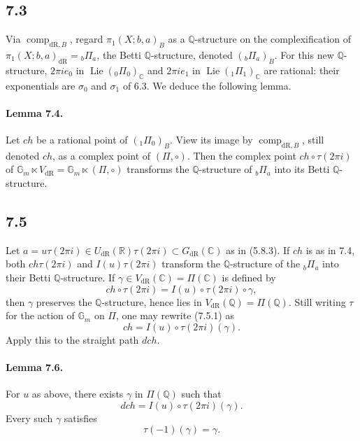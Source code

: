 \documentclass[10pt]{article}
\newcommand{\Q}{\mathbb Q}
\newcommand{\R}{\mathbb R}
\newcommand{\C}{\mathbb C}
\newcommand{\Gm}{\mathbb G_m}
\newcommand{\Lie}{\operatorname{Lie}}
\newcommand{\comp}{\operatorname{comp}}
\newcommand{\dR}{\mathrm{dR}}
\begin{document}
\subsection*{7.3}
Via $\comp_{\dR,B}$, regard $\pi_1(X;b,a)_B$ as a $\Q$-structure on the complexification of $\pi_1(X;b,a)_{\dR}={}_b\Pi_a$, the Betti $\Q$-structure, denoted $({}_b\Pi_a)_B$. For this new $\Q$-structure, $2\pi i e_0$ in $\Lie({}_0\Pi_0)_\C$ and $2\pi i e_1$ in $\Lie({}_1\Pi_1)_\C$ are rational: their exponentials are $\sigma_0$ and $\sigma_1$ of 6.3. We deduce the following lemma.

\paragraph{Lemma 7.4.}
Let $ch$ be a rational point of $({}_1\Pi_0)_B$. View its image by $\comp_{\dR,B}$, still denoted $ch$, as a complex point of $(\Pi,\circ)$. Then the complex point $ch\circ\tau(2\pi i)$ of $\Gm\ltimes V_{\dR}=\Gm\ltimes(\Pi,\circ)$ transforms the $\Q$-structure of ${}_b\Pi_a$ into its Betti $\Q$-structure.

\subsection*{7.5}
Let $a=u\tau(2\pi i)\in U_{\dR}(\R)\tau(2\pi i)\subset G_{\dR}(\C)$ as in (5.8.3). If $ch$ is as in 7.4, both $ch\tau(2\pi i)$ and $I(u)\tau(2\pi i)$ transform the $\Q$-structure of the ${}_b\Pi_a$ into their Betti $\Q$-structure. If $\gamma\in V_{\dR}(\C)=\Pi(\C)$ is defined by
\begin{equation}
ch\circ\tau(2\pi i)=I(u)\circ\tau(2\pi i)\circ\gamma,
\tag{7.5.1}
\end{equation}
then $\gamma$ preserves the $\Q$-structure, hence lies in $V_{\dR}(\Q)=\Pi(\Q)$. Still writing $\tau$ for the action of $\Gm$ on $\Pi$, one may rewrite (7.5.1) as
\[
ch=I(u)\circ\tau(2\pi i)(\gamma).
\]
Apply this to the straight path $dch$.

\paragraph{Lemma 7.6.}
For $u$ as above, there exists $\gamma$ in $\Pi(\Q)$ such that
\begin{equation}
dch=I(u)\circ\tau(2\pi i)(\gamma).
\tag{7.6.1}
\end{equation}
Every such $\gamma$ satisfies
\begin{equation}
\tau(-1)(\gamma)=\gamma.
\tag{7.6.2}
\end{equation}
\end{document}
